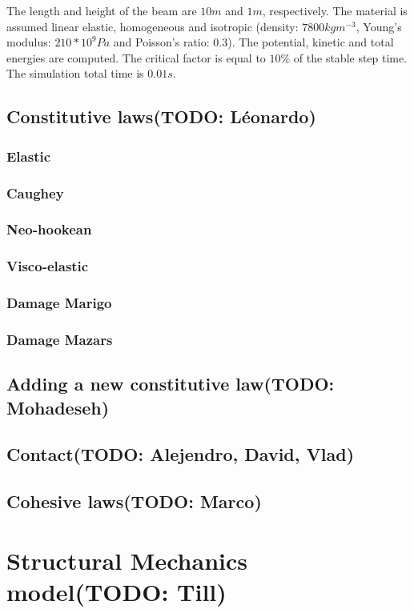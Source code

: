 \documentclass[a4paper,11pt]{book}
\newcommand{\todo}[1]{({\small\color{red}\textbf{TODO: }\textbf{#1}})}
\begin{document}
The length and height of the beam are $10m$ and $1m$, respectively. The material is 
assumed linear elastic, homogeneous and isotropic (density: $7800kgm^{-3}$, Young's 
modulus: $210*10^{9}Pa$ and Poisson's ratio: $0.3$).
The potential, kinetic and total energies are computed. The critical factor is equal to $10\%$ of the stable step time. The simulation total time is $0.01s$.

\subsection{Constitutive laws\todo{L\'eonardo}}
\subsubsection{Elastic}
\subsubsection{Caughey}
\subsubsection{Neo-hookean}
\subsubsection{Visco-elastic}
\subsubsection{Damage Marigo}
\subsubsection{Damage Mazars}

\subsection{Adding a new constitutive law\todo{Mohadeseh}}

\subsection{Contact\todo{Alejendro, David, Vlad}}

\subsection{Cohesive laws\todo{Marco}}


\section{Structural Mechanics model\todo{Till}}
\end{document}
